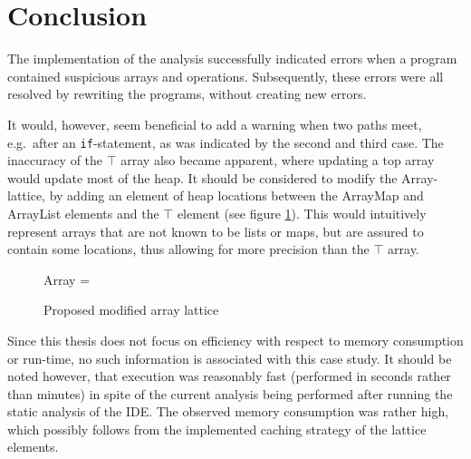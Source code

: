 \newpage\section{Conclusion}
\label{sec:caseConcl}
The implementation of the analysis successfully indicated errors when a program contained suspicious arrays and operations. Subsequently, these errors were all resolved by rewriting the programs, without creating new errors. 

It would, however, seem beneficial to add a warning when two paths meet, e.g.\ after an \texttt{if}-statement, as was indicated by the second and third case. The inaccuracy of the $\top$ array also became apparent, where updating a top array would update most of the heap. It should be considered to modify the Array-lattice, by adding an element of heap locations between the ArrayMap and ArrayList elements and the $\top$ element (see figure \ref{fig:newArray}). This would intuitively represent arrays that are not known to be lists or maps, but are assured to contain some locations, thus allowing for more precision than the $\top$ array. 

\begin{figure}
\centering
Array = 
\caption{Proposed modified array lattice}
\label{fig:newArray}
\end{figure}

Since this thesis does not focus on efficiency with respect to memory consumption or run-time, no such information is associated with this case study. It should be noted however, that execution was reasonably fast (performed in seconds rather than minutes) in spite of the current analysis being performed after running the static analysis of the IDE. The observed memory consumption was rather high, which possibly follows from the implemented caching strategy of the lattice elements.  
